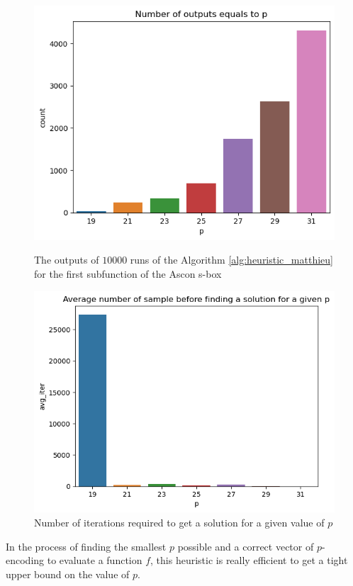 \begin{figure}
  \begin{minipage}{0.48\linewidth}
    \    \centering
    \includegraphics[width=\linewidth]{img/p_encodings/heuristic_ascon_0_p_frequencies.png}
    \caption{The outputs of $10000$ runs of the Algorithm \ref{alg:heuristic_matthieu} for the first subfunction of the Ascon s-box}
    \label{fig:ascon_0_p_frequencies}
  \end{minipage} \hfill
  \begin{minipage}{0.48\linewidth}
    \centering
    \includegraphics[width=\linewidth]{img/p_encodings/heuristric_ascon_0_count_iter.png}
    \caption{Number of iterations required to get a solution for a given value of $p$}
    \label{fig:ascon_0_count_iter}
  \end{minipage}
\end{figure}


In the process of finding the smallest $p$ possible and a correct vector of $p$-encoding to evaluate a function $f$, this heuristic is really efficient to get a tight upper bound on the value of $p$.

